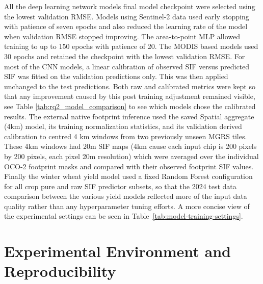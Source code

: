 All the deep learning network models final model checkpoint were selected using the lowest validation RMSE. Models using Sentinel-2 data used early stopping with patience of seven epochs and also reduced the learning rate of the model when validation RMSE stopped improving. The area-to-point MLP allowed training to up to 150 epochs with patience of 20. The MODIS based models used 30 epochs and retained the checkpoint with the lowest validation RMSE. For most of the CNN models, a linear calibration of observed SIF versus predicted SIF was fitted on the validation predictions only. This was then applied unchanged to the test predictions. Both raw and calibrated metrics were kept so that any improvement caused by this post training adjustment remained visible, see Table \ref{tab:rq2_model_comparison} to see which models chose the calibrated results. The external native footprint inference used the saved Spatial aggregate (4km) model, its training normalization statistics, and its validation derived calibration to centred 4 km windows from two previously unseen MGRS tiles. These 4km windows had 20m SIF maps (4km cause each input chip is 200 pixels by 200 pixels, each pixel 20m resolution) which were averaged over the individual OCO-2 footprint masks and compared with their observed footprint SIF values. Finally the winter wheat yield model used a fixed Random Forest configuration for all crop pure and raw SIF predictor subsets, so that the 2024 test data comparison between the various yield models reflected more of the input data quality rather than any hyperparameter tuning efforts. A more concise view of the experimental settings can be seen in Table~\ref{tab:model-training-settings}.


\section{Experimental Environment and Reproducibility}

